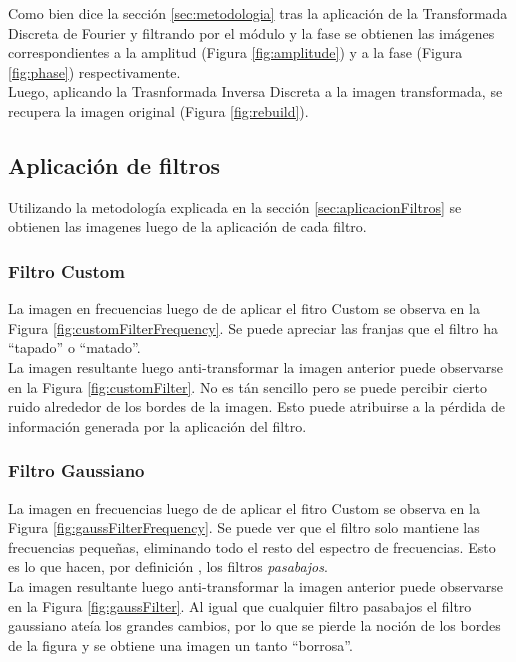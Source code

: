 \documentclass[twocolumn,a4paper,10pt]{article}
\begin{document}
Como bien dice la secci\'on \ref{sec:metodologia}
tras la aplicaci\'on de la Transformada Discreta de Fourier y filtrando por el m\'odulo y la fase se obtienen las im\'agenes correspondientes a la amplitud
(Figura \ref{fig:amplitude}) y a la fase (Figura \ref{fig:phase}) respectivamente. \\

Luego, aplicando la Trasnformada Inversa Discreta a la imagen transformada, se recupera la imagen original (Figura \ref{fig:rebuild}).

\subsection{Aplicaci\'on de filtros}

Utilizando la metodolog\'ia explicada en la secci\'on \ref{sec:aplicacionFiltros}
se obtienen las imagenes luego de la aplicaci\'on de cada filtro. \\

\subsubsection{Filtro Custom}

La imagen en frecuencias luego de de aplicar el fitro Custom se observa en la Figura \ref{fig:customFilterFrequency}. Se puede apreciar 
las franjas que el filtro ha ``tapado'' o ``matado''. \\
La imagen resultante luego anti-transformar la imagen anterior puede observarse en la Figura \ref{fig:customFilter}. No es t\'an sencillo pero 
se puede percibir cierto ruido alrededor de los bordes de la imagen. Esto puede atribuirse a la p\'erdida de informaci\'on generada por la aplicaci\'on
del filtro.

\subsubsection{Filtro Gaussiano}
La imagen en frecuencias luego de de aplicar el fitro Custom se observa en la Figura \ref{fig:gaussFilterFrequency}. Se puede ver que el filtro solo mantiene
las frecuencias pequeñas, eliminando todo el resto del espectro de frecuencias. Esto es lo que hacen, por definici\'on \cite{Wikipedia_FiltroPasabajo},
los filtros \textit{pasabajos}. \\
La imagen resultante luego anti-transformar la imagen anterior puede observarse en la Figura \ref{fig:gaussFilter}. Al igual que cualquier filtro pasabajos
el filtro gaussiano ate\'ia los grandes cambios, por lo que se pierde la noci\'on de los bordes de la figura y se obtiene una imagen un tanto ``borrosa''.
\end{document}
